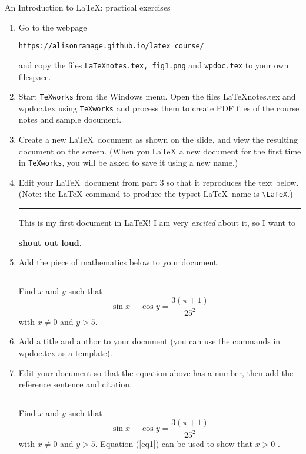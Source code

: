 \documentclass[12pt]{article}
\begin{document}
\begin{center}
{\large An Introduction to \LaTeX : practical exercises}
\end{center}
\begin{enumerate}
\item Go to the webpage
\begin{center}
\texttt{https://alisonramage.github.io/latex\_course/}
\end{center}
and copy the files \texttt{LaTeXnotes.tex, fig1.png}  and \texttt{wpdoc.tex}
 to your own filespace.

\item Start \texttt{TeXworks} from the Windows menu. Open the 
files LaTeXnotes.tex and wpdoc.tex using \texttt{TeXworks} and process them
to create PDF files of the course notes and sample document. 

\item Create a new \LaTeX\, document as shown on the slide, and view the 
resulting document on the screen. (When you LaTeX a new document for the first 
time in \texttt{TeXworks}, you will be asked to save it using a new name.)

\item Edit your \LaTeX\, document from part 3 so that it reproduces the text 
below. (Note: the LaTeX command to produce the typset \LaTeX\, name is 
\verb+\LaTeX+.)\\
\rule{16cm}{0.01cm}
\medskip

This is my first document in \LaTeX! I am very \textit{excited} 
about it, so I want to 
\begin{center}
\textbf{shout out loud}.
\end{center}

\bigskip
\item Add the piece of mathematics below to your document.\\
\rule{16cm}{0.01cm}

Find $x$ and $y$ such that
\begin{displaymath}
\sin{x}+\cos{y}=\frac{3(\pi+1)}{25^2}
\end{displaymath}
with $x\ne 0$ and $y>5$.

\bigskip
\item Add a title and author to your document (you can use the commands in 
wpdoc.tex as a template).

\bigskip
\item Edit your document so that the equation above has a number, then add the 
reference sentence and citation.\\
\rule{16cm}{0.01cm}


Find $x$ and $y$ such that
\begin{equation}
\sin{x}+\cos{y}=\frac{3(\pi+1)}{25^2}
\label{eq1}
\end{equation}
with $x\ne 0$ and $y>5$. Equation (\ref{eq1}) can be used to show that $x>0$ 
\cite{faketext}.
\begin{thebibliography}{99}
\end{thebibliography}

\end{enumerate}
\end{document}
